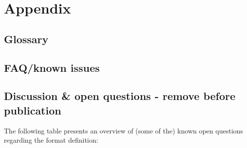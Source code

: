 \documentclass[a4paper,10pt,bibtotoc]{scrartcl}
\begin{document}





\clearpage

\appendix
\section{Appendix}

\subsection{Glossary}
\label{sec:glossary}



\subsection{FAQ/known issues}


\subsection{Discussion \& open questions - remove before publication}

The following table presents an overview of (some of the) known open
questions regarding the format definition:
\end{document}
